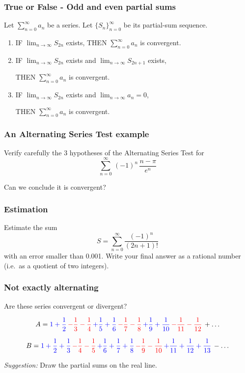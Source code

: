 \documentclass[14pt]{beamer}
\newcommand {\DS} [1] {${\displaystyle #1}$}
\newcommand{\azul}[1]{{\color{blue} #1}}
\newcommand{\rojo}[1]{{\color{red} #1}}
\newcommand{\setsize}[1]{\fontsize{#1}{#1}\selectfont} %
\newcommand{\smallerfont}{\setsize{13}} %
\newcommand{\suman}{\sum_{n=0}^{\infty} a_n}
\newcommand{\vv}{\vspace{.5cm}}
\newcommand{\vvv}{\vspace{.2cm}}
\begin{document}
\begin{frame}[t]
\setsize{12}
\frametitle{True or False - Odd and even partial sums}

Let \DS{\sum_{n=0}^{\infty} a_n} be a series.  
Let \DS{\{ S_n \}_{n=0}^{\infty}} be its partial-sum sequence.

\begin{enumerate}
	\item  IF \DS{\lim_{n \to \infty} S_{2n}} exists, \quad 
		THEN \;  \azul{\DS{\suman} is convergent}.
\vv
		
	\item  IF \DS{\lim_{n \to \infty} S_{2n}} exists \; and \; \DS{\lim_{n \to \infty} S_{2n+1}} exists,  
	
		THEN \; \azul{\DS{\suman} is convergent}.
\vv
	
	\item  IF \DS{\lim_{n \to \infty} S_{2n}} exists \; and \;  \DS{\lim_{n \to \infty} a_n = 0}, 
	
		THEN  \; \azul{\DS{\suman} is convergent}.

\end{enumerate}

\end{frame}
\begin{frame}[t]
\frametitle{ An Alternating Series Test example}

Verify carefully the 3 hypotheses of the Alternating Series Test for
	$$
		\sum_{n=0}^{\infty} \, (-1)^n \, \frac{n - \pi}{e^n}
	$$

Can we conclude it is convergent?

\end{frame}
\begin{frame}[t]
\frametitle{Estimation}

Estimate the sum
	$$
		S = \sum_{n=0}^{\infty} \frac{(-1)^n}{(2n+1)!}
	$$
with an error smaller than 0.001.  Write your final answer as a rational number (i.e.\ as a quotient of two integers).


\end{frame}
\begin{frame}[t]
\smallerfont
\frametitle{Not exactly alternating}

Are these series convergent or divergent?

$$
	A = \azul{1 + \frac{1}{2}} \, \rojo{ - \frac{1}{3} - \frac{1}{4}} \, \azul{ + \frac{1}{5} + \frac{1}{6}} \, \rojo{ - \frac{1}{7} - \frac{1}{8}} \, \azul{ + \frac{1}{9} + \frac{1}{10}} \, \rojo{ - \frac{1}{11} - \frac{1}{12}} \, + \ldots
$$


$$
	B = \azul{1 + \frac{1}{2} + \frac{1}{3}} \, \rojo{ - \frac{1}{4} - \frac{1}{5}} \, \azul{ + \frac{1}{6}  + \frac{1}{7} + \frac{1}{8}} \, \rojo{ - \frac{1}{9} - \frac{1}{10}} \, \azul{ + \frac{1}{11} + \frac{1}{12} + \frac{1}{13}} \, - \ldots
$$
\vvv
	
\emph{Suggestion:}  Draw the partial sums on the real line.

\end{frame}
\end{document}
